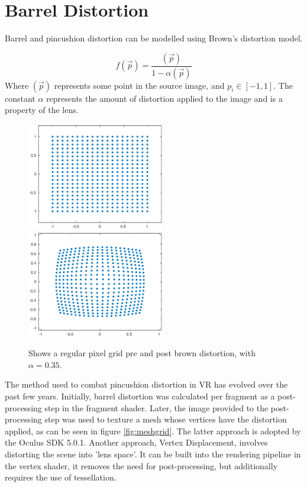 \documentclass[12pt,a4paper,twoside,openright]{report}
\begin{document}
\section{Barrel Distortion}\label{barSection}

Barrel and pincushion distortion can be modelled using Brown's distortion model. 

\[
f(\vec p) = \frac{(\vec p)}{1-\alpha(\vec p)}
\]
Where $(\vec p)$ represents some point in the source image, and $p_i\in[-1,1]$. The constant $\alpha$ represents the amount of distortion applied to the image and is a property of the lens.

\begin{figure}[tbh]
\begin{center}
\includegraphics[width=6cm]{figs/pre_distortion.eps}
\includegraphics[width=6cm]{figs/post_distortion.eps}
\caption{Shows a regular pixel grid pre and post brown distortion, with $\alpha = 0.35 $.}
\label{epsfig1}
\end{center}
\end{figure}
\noindent The method used to combat pincushion distortion in VR has evolved over the past few years. Initially, barrel distortion was calculated per fragment as a post-processing step in the fragment shader. Later, the image provided to the post-processing step was used to texture a mesh whose vertices have the distortion applied, as can be seen in figure \ref {fig:meshgrid}. The latter approach is adopted by the Oculus SDK 5.0.1. Another approach, Vertex Displacement, involves distorting the scene into 'lens space'. It can be built into the rendering pipeline in the vertex shader, it removes the need for post-processing, but additionally requires the use of tessellation. \cite{vertexDisplacement}
\end{document}
